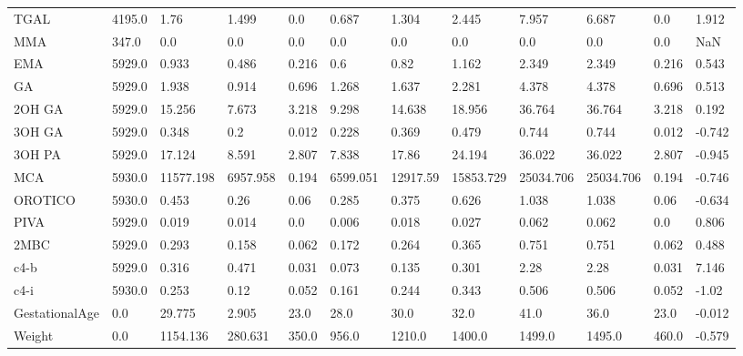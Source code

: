 \begin{tabular}{|l|l|l|l|l|l|l|l|l|l|l|l|}
TGAL & 4195.0 & 1.76 & 1.499 & 0.0 & 0.687 & 1.304 & 2.445 & 7.957 & 6.687 & 0.0 & 1.912 \\
MMA & 347.0 & 0.0 & 0.0 & 0.0 & 0.0 & 0.0 & 0.0 & 0.0 & 0.0 & 0.0 & NaN \\
EMA & 5929.0 & 0.933 & 0.486 & 0.216 & 0.6 & 0.82 & 1.162 & 2.349 & 2.349 & 0.216 & 0.543 \\
GA & 5929.0 & 1.938 & 0.914 & 0.696 & 1.268 & 1.637 & 2.281 & 4.378 & 4.378 & 0.696 & 0.513 \\
2OH GA & 5929.0 & 15.256 & 7.673 & 3.218 & 9.298 & 14.638 & 18.956 & 36.764 & 36.764 & 3.218 & 0.192 \\
3OH GA & 5929.0 & 0.348 & 0.2 & 0.012 & 0.228 & 0.369 & 0.479 & 0.744 & 0.744 & 0.012 & -0.742 \\
3OH PA & 5929.0 & 17.124 & 8.591 & 2.807 & 7.838 & 17.86 & 24.194 & 36.022 & 36.022 & 2.807 & -0.945 \\
MCA & 5930.0 & 11577.198 & 6957.958 & 0.194 & 6599.051 & 12917.59 & 15853.729 & 25034.706 & 25034.706 & 0.194 & -0.746 \\
OROTICO & 5930.0 & 0.453 & 0.26 & 0.06 & 0.285 & 0.375 & 0.626 & 1.038 & 1.038 & 0.06 & -0.634 \\
PIVA & 5929.0 & 0.019 & 0.014 & 0.0 & 0.006 & 0.018 & 0.027 & 0.062 & 0.062 & 0.0 & 0.806 \\
2MBC & 5929.0 & 0.293 & 0.158 & 0.062 & 0.172 & 0.264 & 0.365 & 0.751 & 0.751 & 0.062 & 0.488 \\
c4-b & 5929.0 & 0.316 & 0.471 & 0.031 & 0.073 & 0.135 & 0.301 & 2.28 & 2.28 & 0.031 & 7.146 \\
c4-i & 5930.0 & 0.253 & 0.12 & 0.052 & 0.161 & 0.244 & 0.343 & 0.506 & 0.506 & 0.052 & -1.02 \\
GestationalAge & 0.0 & 29.775 & 2.905 & 23.0 & 28.0 & 30.0 & 32.0 & 41.0 & 36.0 & 23.0 & -0.012 \\
Weight & 0.0 & 1154.136 & 280.631 & 350.0 & 956.0 & 1210.0 & 1400.0 & 1499.0 & 1495.0 & 460.0 & -0.579 \\
\bottomrule
\end{tabular}
